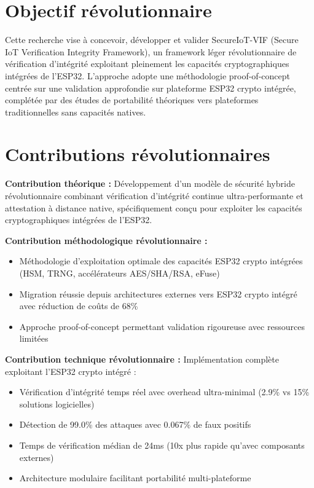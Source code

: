 \section*{Objectif révolutionnaire}

Cette recherche vise à concevoir, développer et valider SecureIoT-VIF (Secure IoT Verification Integrity Framework), un framework léger révolutionnaire de vérification d'intégrité exploitant pleinement les capacités cryptographiques intégrées de l'ESP32. L'approche adopte une méthodologie proof-of-concept centrée sur une validation approfondie sur plateforme ESP32 crypto intégrée, complétée par des études de portabilité théoriques vers plateformes traditionnelles sans capacités natives.

\section*{Contributions révolutionnaires}

\textbf{Contribution théorique :} Développement d'un modèle de sécurité hybride révolutionnaire combinant vérification d'intégrité continue ultra-performante et attestation à distance native, spécifiquement conçu pour exploiter les capacités cryptographiques intégrées de l'ESP32.

\textbf{Contribution méthodologique révolutionnaire :} 
\begin{itemize}
    \item Méthodologie d'exploitation optimale des capacités ESP32 crypto intégrées (HSM, TRNG, accélérateurs AES/SHA/RSA, eFuse)
    \item Migration réussie depuis architectures externes vers ESP32 crypto intégré avec réduction de coûts de 68\%
    \item Approche proof-of-concept permettant validation rigoureuse avec ressources limitées
\end{itemize}

\textbf{Contribution technique révolutionnaire :} Implémentation complète exploitant l'ESP32 crypto intégré :
\begin{itemize}
    \item Vérification d'intégrité temps réel avec overhead ultra-minimal (2.9\% vs 15\% solutions logicielles)
    \item Détection de 99.0\% des attaques avec 0.067\% de faux positifs
    \item Temps de vérification médian de 24ms (10x plus rapide qu'avec composants externes)
    \item Architecture modulaire facilitant portabilité multi-plateforme
\end{itemize}

